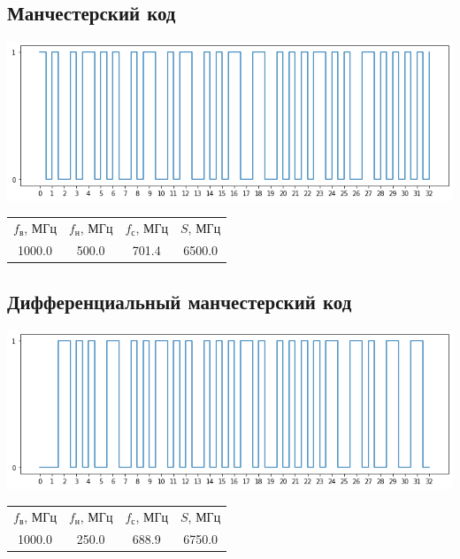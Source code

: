\subsection{Манчестерский код}
\includegraphics[width=\textwidth]{2manchester}
\begin{center}
    \begin{tabular}{cccc}
        $f_\mathrm{\text{в}}$, МГц & $f_\mathrm{\text{н}}$, МГц & $f_\mathrm{\text{с}}$, МГц & $S$, МГц \\
        1000.0 & 500.0 & 701.4 & 6500.0 \\
    \end{tabular}
\end{center}

\subsection{Дифференциальный манчестерский код}
\includegraphics[width=\textwidth]{2manchester_diff}
\begin{center}
    \begin{tabular}{cccc}
        $f_\mathrm{\text{в}}$, МГц & $f_\mathrm{\text{н}}$, МГц & $f_\mathrm{\text{с}}$, МГц & $S$, МГц \\
        1000.0 & 250.0 & 688.9 & 6750.0 \\
    \end{tabular}
\end{center}

